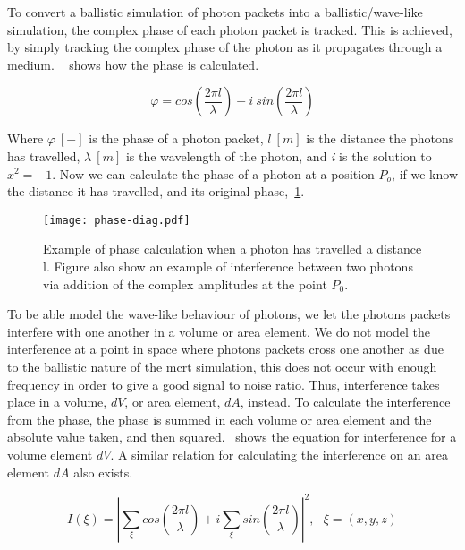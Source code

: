 To convert a ballistic simulation of photon packets into a ballistic/wave-like simulation, the complex phase of each photon packet is tracked.
This is achieved, by simply tracking the complex phase of the photon as it propagates through a medium.
~ shows how the phase is calculated.

\begin{equation}
    \varphi = cos\left(\frac{2 \pi l}{\lambda}\right) + i\ sin\left(\frac{2 \pi l}{\lambda}\right)
    \label{eqn:phase}
\end{equation}

Where $\varphi~[-]$ is the phase of a photon packet, $l\ [m]$ is the distance the photons has travelled, $\lambda~[m]$ is the wavelength of the photon, and \textit{i} is the solution to $x^2=-1$.
Now we can calculate the phase of a photon at a position $P_o$, if we know the distance it has travelled, and its original phase,~\cref{fig:phase-diag}.

\begin{figure}[!ht]
    \centering
    \texttt{[image: phase-diag.pdf]}
    \caption{Example of phase calculation when a photon has travelled a distance l. Figure also show an example of interference between two photons via addition of the complex amplitudes at the point $P_0$.}
    \label{fig:phase-diag}
\end{figure}

To be able model the wave-like behaviour of photons, we let the photons packets interfere with one another in a volume or area element. 
We do not model the interference at a point in space where photons packets cross one another as due to the ballistic nature of the \gls*{mcrt} simulation, this does not occur with enough frequency in order to give a good signal to noise ratio. 
Thus, interference takes place in a volume, $dV$, or area element, $dA$, instead.
To calculate the interference from the phase, the phase is summed in each volume or area element and the absolute value taken, and then squared.~ shows the equation for interference for a volume element $dV$. A similar relation for calculating the interference on an area element $dA$ also exists.

\begin{equation}
I(\xi)=\left| \sum\limits_{\xi}cos\left(\frac{2\pi l}{\lambda}\right) + i \sum\limits_{\xi}sin\left(\frac{2\pi l}{\lambda}\right)\right|^2,\ \ \ \xi=(x,y,z)
\label{eqn:intense}
\end{equation}

